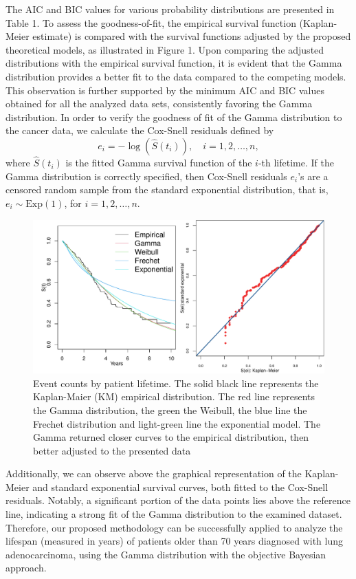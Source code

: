 \documentclass[12pt]{article} %
\theoremstyle{plain}%
\theoremstyle{definition}
\theoremstyle{remark}
\begin{document}
The AIC and BIC values for various probability distributions are presented in Table 1. To assess the goodness-of-fit, the empirical survival function (Kaplan-Meier estimate) is compared with the survival functions adjusted by the proposed theoretical models, as illustrated in Figure 1. Upon comparing the adjusted distributions with the empirical survival function, it is evident that the Gamma distribution provides a better fit to the data compared to the competing models. This observation is further supported by the minimum AIC and BIC values obtained for all the analyzed data sets, consistently favoring the Gamma distribution. In order to verify the goodness of fit of the Gamma distribution to the cancer data, we calculate the Cox-Snell residuals \citep{cox1968} defined by
\begin{equation*}
    e_i=-\log \left(\hat S(t_i)\right),\quad  i=1,2,\ldots,n,
\end{equation*}
where $\hat S(t_i)$ is the fitted Gamma survival function of the $i$-th lifetime.  If the Gamma distribution  is correctly specified, then Cox-Snell residuals $e_i$'s are a censored random sample from the standard exponential distribution, that is, $e_i\sim \text{Exp}(1)$, for $i=1,2,\ldots,n$.

\begin{figure}[!h] 
	\centering
	\includegraphics[scale=0.50]{survival.pdf}
	\caption{Event counts by patient lifetime. The solid
black line represents the Kaplan-Maier (KM) empirical distribution. The red line
represents the Gamma distribution, the green the Weibull, the blue line the Frechet distribution and light-green line the exponential model. The
Gamma returned closer curves to the empirical distribution, then better adjusted to the
presented data}\label{grafico-obscajust1}
\end{figure}

Additionally, we can observe above the graphical representation of the Kaplan-Meier and standard exponential survival curves, both fitted to the Cox-Snell residuals. Notably, a significant portion of the data points lies above the reference line, indicating a strong fit of the Gamma distribution to the examined dataset. Therefore, our proposed methodology can be successfully applied to analyze the lifespan (measured in years) of patients older than 70 years diagnosed with lung adenocarcinoma, using the Gamma distribution with the objective Bayesian approach.
\end{document}

